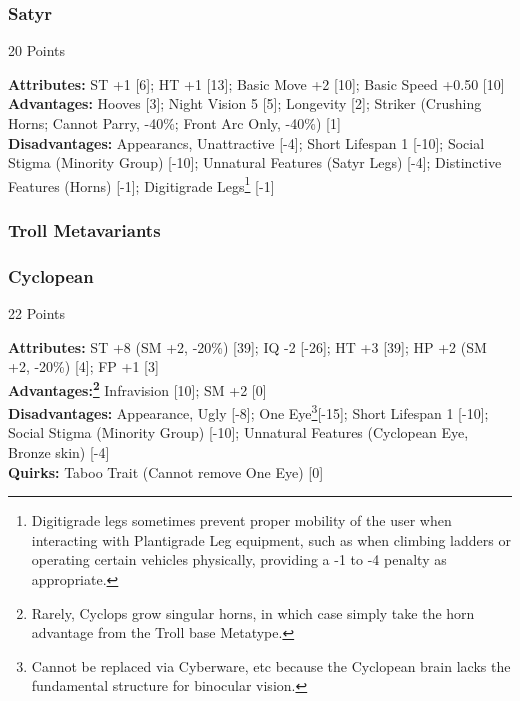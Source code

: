 \begin{multicols*}{3}
	\subsubsection*{Satyr}
	\begin{flushright}
		20 Points
	\end{flushright}
	\textbf{Attributes:} 
	ST +1 [6]; HT +1 [13]; Basic Move +2 [10]; Basic Speed +0.50 [10]
	\\\textbf{Advantages:} 
	Hooves [3]; Night Vision 5 [5]; Longevity [2]; Striker (Crushing Horns; Cannot Parry, -40\%; Front Arc Only, -40\%) [1]
	\\\textbf{Disadvantages:} 
	Appearancs, Unattractive [-4]; Short Lifespan 1 [-10]; Social Stigma (Minority Group) [-10]; Unnatural Features (Satyr Legs) [-4]; Distinctive Features (Horns) [-1]; Digitigrade Legs\footnote{Digitigrade legs sometimes prevent proper mobility of the user when interacting with Plantigrade Leg equipment, such as when climbing ladders or operating certain vehicles physically, providing a -1 to -4 penalty as appropriate.} [-1]
	
	\subsubsection{Troll Metavariants}
	
	\subsubsection*{Cyclopean}
	\begin{flushright}
		22 Points
	\end{flushright}
	\textbf{Attributes:} 
	ST +8 (SM +2, -20\%) [39]; IQ -2 [-26]; HT +3 [39]; HP +2 (SM +2, -20\%) [4]; FP +1 [3]
	\\\textbf{Advantages:\footnote{Rarely, Cyclops grow singular horns, in which case simply take the horn advantage from the Troll base Metatype.}} 
	Infravision [10]; SM +2 [0]
	\\\textbf{Disadvantages:} 
	Appearance, Ugly [-8]; One Eye\footnote{Cannot be replaced via  Cyberware, etc because the Cyclopean brain lacks the fundamental structure for binocular vision.}[-15]; Short Lifespan 1 [-10]; Social Stigma (Minority Group) [-10]; Unnatural Features (Cyclopean Eye, Bronze skin) [-4]
	\\\textbf{Quirks:}
	Taboo Trait (Cannot remove One Eye) [0]
	

\end{multicols*}
